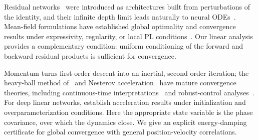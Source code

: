 Residual networks~\citep{HeZhangRenSun2016Deep,HeZhangRenSun2016Identity} were introduced as architectures built from perturbations of the identity, and their infinite depth limit leads naturally to neural ODEs~\citep{HeZhangRenSun2016Deep,ChenRubanovaBettencourtDuvenaud2018}.
Mean-field formulations have established global optimality and convergence results under expressivity, regularity, or local PL conditions~\citep{LuMaLuLuYing2020,DingChenLiWright2021,Isobe2023,BarboniPeyreVialard2024COTResNets}.
Our linear analysis provides a complementary condition: uniform conditioning of the forward and backward residual products is sufficient for convergence.

Momentum turns first-order descent into an inertial, second-order iteration; the heavy-ball method of~\cite{Polyak1964} and Nesterov acceleration~\citep{Nesterov1983} have mature convergence theories, including continuous-time interpretations~\citep{SuBoydCandes2016} and robust-control analyses~\citep{LessardRechtPackard2016}.
For deep linear networks, \citet{WangLinAbernethy2021,LiuTaoPan2022}
establish acceleration results under initialization and overparameterization
conditions. Here the appropriate state variable is the phase covariance, over which the dynamics close.
We give an explicit energy-damping certificate for global convergence
with general position-velocity correlations. 

